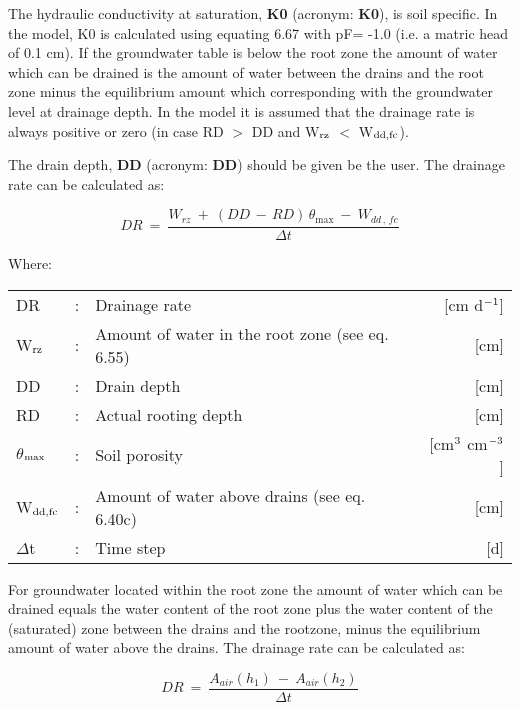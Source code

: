 The hydraulic conductivity at saturation, {\bf K0}  (acronym: {\bf K0}), is soil specific. In the
model, K0 is calculated using equating 6.67 with pF= -1.0 (i.e. a matric head of 0.1
cm). If the groundwater table is below the root zone the amount of water which can be
drained is the amount of water between the drains and the root zone minus the equilibrium 
amount which corresponding with the groundwater level at drainage depth. In the
model it is assumed that the drainage rate is always positive or zero (in case RD $>$ DD
and W$_{{\rm rz}}$ $<$ W$_{{\rm dd,fc}}$).

The drain depth, {\bf DD} (acronym: {\bf DD}) should be given be the user. The drainage rate can
be calculated as:

\begin{equation}
DR ~=~{\frac{W _{rz} ~+~ (DD\, -\, RD)\, \theta _{\max } ~-~ W _{dd\, ,\, fc} }{\Delta t}}
\end{equation}

Where:\\[5pt]
\begin{tabularx}{\textwidth}{llXr}
DR &:& Drainage rate  & [cm d$^{{\rm -1}}$]\\
W$_{{\rm rz}}$ &:& Amount of water in the root zone (see eq. 6.55)  & [cm]\\
DD &:& Drain depth  & [cm]\\
RD &:& Actual rooting depth  & [cm]\\
$\theta$$_{{\rm max}}$ &:& Soil porosity  & [cm$^{{\rm 3}}$ cm$^{{\rm -3}}$]\\
W$_{{\rm dd,fc}}$ &:& Amount of water above drains (see eq. 6.40c)  & [cm]\\
$\Delta$t &:& Time step  & [d]\\ 
\end{tabularx}

For groundwater located within the root zone the amount of water which can be drained
equals the water content of the root zone plus the water content of the (saturated) zone
between the drains and the rootzone, minus the equilibrium amount of water above the
drains. The drainage rate can be calculated as:

\begin{equation}
DR ~=~{\frac{A_{air} (h_{1} )~-~ A_{air} (h_{2} )}{\Delta t}}
\end{equation}

